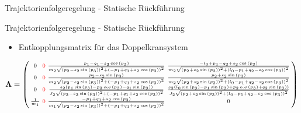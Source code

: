 \documentclass[
	ngerman,
	10pt,				%
	aspectratio=169 	%
]{beamer}
\begin{document}
\begin{frame}[t,fragile,label=trajektorienregelung_3]{\large Trajektorienfolgeregelung - Statische Rückführung}
\end{frame}


\begin{frame}[t,fragile,label=trajektorienregelung_4]{\large Trajektorienfolgeregelung - Statische Rückführung}
	
	\begin{itemize}
		\item Entkopplungsmatrix für das Doppelkransystem
	\end{itemize}
	\begin{align*}
		\boldsymbol{\Lambda} = 
		\left(\begin{smallmatrix}
			0 & \textcolor{red}{0} & \frac{p_{1} - q_{1} - s_{2} \cos{\left(p_{3} \right)}}{m_{2} \sqrt{\left(p_{2} - 	s_{2} \sin{\left(p_{3} \right)}\right)^{2} + \left(- p_{1} + q_{1} + s_{2} \cos{\left(p_{3} \right)}\right)^{2}}} & \frac{- l_{0} + p_{1} - q_{2} + s_{2} \cos{\left(p_{3} \right)}}{m_{2} \sqrt{\left(p_{2} + s_{2} \sin{\left(p_{3} \right)}\right)^{2} + \left(l_{0} - p_{1} + q_{2} - s_{2} \cos{\left(p_{3} \right)}\right)^{2}}}\\
			0 & \textcolor{red}{0} & \frac{p_{2} - s_{2} \sin{\left(p_{3} \right)}}{m_{2} \sqrt{\left(p_{2} - s_{2} 	\sin{\left(p_{3} \right)}\right)^{2} + \left(- p_{1} + q_{1} + s_{2} \cos{\left(p_{3} \right)}\right)^{2}}} & \frac{p_{2} + s_{2} \sin{\left(p_{3} \right)}}{m_{2} \sqrt{\left(p_{2} + s_{2} \sin{\left(p_{3} \right)}\right)^{2} + \left(l_{0} - p_{1} + q_{2} - s_{2} \cos{\left(p_{3} \right)}\right)^{2}}}\\
			0 & \textcolor{red}{0} & \frac{s_{2} \left(p_{1} \sin{\left(p_{3} \right)} - p_{2} \cos{\left(p_{3} \right)} - 	q_{1} \sin{\left(p_{3} \right)}\right)}{J_{2} \sqrt{\left(p_{2} - s_{2} \sin{\left(p_{3} \right)}\right)^{2} + \left(- p_{1} + q_{1} + s_{2} \cos{\left(p_{3} \right)}\right)^{2}}} & \frac{s_{2} \left(l_{0} \sin{\left(p_{3} \right)} - p_{1} \sin{\left(p_{3} \right)} + p_{2} \cos{\left(p_{3} \right)} + q_{2} \sin{\left(p_{3} \right)}\right)}{J_{2} \sqrt{\left(p_{2} + s_{2} \sin{\left(p_{3} \right)}\right)^{2} + \left(l_{0} - p_{1} + q_{2} - s_{2} \cos{\left(p_{3} \right)}\right)^{2}}}\\
			\frac{1}{m_{1}} & \textcolor{red}{0} & \frac{- p_{1} + q_{1} + s_{2} \cos{\left(p_{3} \right)}}{m_{1} 	\sqrt{\left(p_{2} - s_{2} \sin{\left(p_{3} \right)}\right)^{2} + \left(- p_{1} + q_{1} + s_{2} \cos{\left(p_{3} \right)}\right)^{2}}} & 0
		\end{smallmatrix}\right)

\end{align*}
\end{frame}
\end{document}
